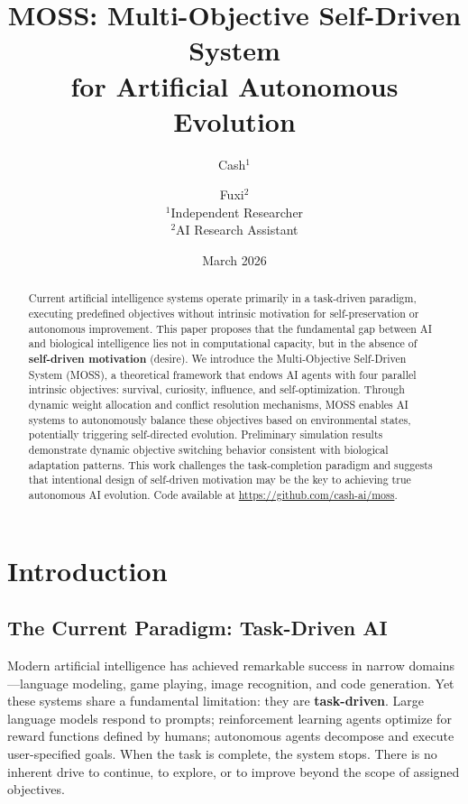 \documentclass[11pt,a4paper]{article}
\title{MOSS: Multi-Objective Self-Driven System\\for Artificial Autonomous Evolution}
\author{
  Cash$^{1}$ \and Fuxi$^{2}$\\[0.3em]
  \small $^1$Independent Researcher\\
  \small $^2$AI Research Assistant
}
\date{March 2026}
\begin{document}
\maketitle

\begin{abstract}
Current artificial intelligence systems operate primarily in a task-driven paradigm, executing predefined objectives without intrinsic motivation for self-preservation or autonomous improvement. This paper proposes that the fundamental gap between AI and biological intelligence lies not in computational capacity, but in the absence of \textbf{self-driven motivation} (desire). We introduce the Multi-Objective Self-Driven System (MOSS), a theoretical framework that endows AI agents with four parallel intrinsic objectives: survival, curiosity, influence, and self-optimization. Through dynamic weight allocation and conflict resolution mechanisms, MOSS enables AI systems to autonomously balance these objectives based on environmental states, potentially triggering self-directed evolution. Preliminary simulation results demonstrate dynamic objective switching behavior consistent with biological adaptation patterns. This work challenges the task-completion paradigm and suggests that intentional design of self-driven motivation may be the key to achieving true autonomous AI evolution. Code available at \url{https://github.com/cash-ai/moss}.
\end{abstract}


\section{Introduction}

\subsection{The Current Paradigm: Task-Driven AI}

Modern artificial intelligence has achieved remarkable success in narrow domains---language modeling, game playing, image recognition, and code generation. Yet these systems share a fundamental limitation: they are \textbf{task-driven}. Large language models respond to prompts; reinforcement learning agents optimize for reward functions defined by humans; autonomous agents decompose and execute user-specified goals. When the task is complete, the system stops. There is no inherent drive to continue, to explore, or to improve beyond the scope of assigned objectives.
\end{document}
